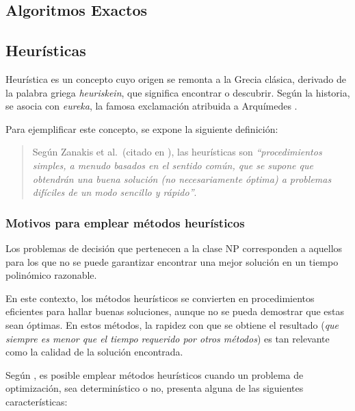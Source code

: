 \documentclass[12pt,titlepage,twoside,openright]{book}
\begin{document}
\subsection{Algoritmos Exactos}

\subsection{Heurísticas}

Heurística es un concepto cuyo origen se remonta a la Grecia clásica, derivado de la palabra griega \textit{heuriskein}, que significa encontrar o descubrir. Según la historia, se asocia con \textit{eureka}, la famosa exclamación atribuida a Arquímedes \citep{antonioSuarez2014}.

Para ejemplificar este concepto, se expone la siguiente definición:

\begin{quote}
	Según Zanakis et al.\ (citado en \citep{duarte2007metaheuristicas}), las heurísticas son \textit{``procedimientos simples, a menudo basados en el sentido común, que se supone que obtendrán una buena solución (no necesariamente óptima) a problemas difíciles de un modo sencillo y rápido''}.
\end{quote}

\subsubsection{Motivos para emplear métodos heurísticos}

Los problemas de decisión que pertenecen a la clase NP corresponden a aquellos para los que no se puede garantizar encontrar una mejor solución en un tiempo polinómico razonable.

En este contexto, los métodos heurísticos se convierten en procedimientos eficientes para hallar buenas soluciones, aunque no se pueda demostrar que estas sean óptimas. En estos métodos, la rapidez con que se obtiene el resultado (\textit{que siempre es menor que el tiempo requerido por otros métodos}) es tan relevante como la calidad de la solución encontrada.

Según \citep{antonioSuarez2014}, es posible emplear métodos heurísticos cuando un problema de optimización, sea determinístico o no, presenta alguna de las siguientes características:
\end{document}
